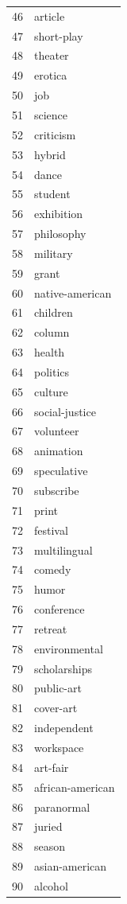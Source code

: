 \documentclass[12pt]{report}   %
\begin{document}
\begin{figure}[h]
\begin{minipage}[h]{0.24\textwidth}
\begin{tabular}{rl}
  46 & article \\ 
  47 & short-play \\ 
  48 & theater \\ 
  49 & erotica \\ 
  50 & job \\ 
  51 & science \\ 
  52 & criticism \\ 
  53 & hybrid \\ 
  54 & dance \\ 
  55 & student \\ 
  56 & exhibition \\ 
  57 & philosophy \\ 
  58 & military \\ 
  59 & grant \\ 
  60 & native-american \\ 
  61 & children \\ 
  62 & column \\ 
  63 & health \\ 
  64 & politics \\ 
  65 & culture \\ 
  66 & social-justice \\ 
  67 & volunteer \\ 
  68 & animation \\ 
  69 & speculative \\ 
  70 & subscribe \\ 
  71 & print \\ 
  72 & festival \\ 
  73 & multilingual \\ 
  74 & comedy \\ 
  75 & humor \\ 
  76 & conference \\ 
  77 & retreat \\ 
  78 & environmental \\ 
  79 & scholarships \\ 
  80 & public-art \\ 
  81 & cover-art \\ 
  82 & independent \\ 
  83 & workspace \\ 
  84 & art-fair \\ 
  85 & african-american \\ 
  86 & paranormal \\ 
  87 & juried \\ 
  88 & season \\ 
  89 & asian-american \\ 
  90 & alcohol \\ 
  

\end{tabular}
\end{minipage}
\end{figure}
\end{document}
